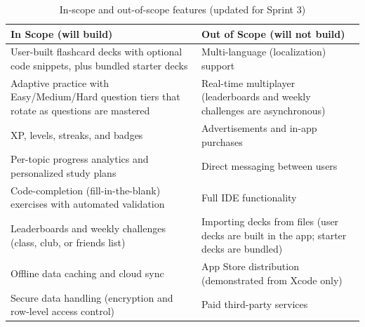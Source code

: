 \documentclass[12pt,letterpaper]{article}
\begin{document}
\begin{table}[H]
\centering
\caption{In-scope and out-of-scope features (updated for Sprint 3)}
\label{tab:scope}
\begin{tabularx}{\textwidth}{@{}Y Y@{}}
\toprule
\textbf{In Scope (will build)} & \textbf{Out of Scope (will not build)} \\
\midrule
User-built flashcard decks with optional code snippets, plus bundled starter decks & Multi-language (localization) support \\
Adaptive practice with Easy/Medium/Hard question tiers that rotate as questions are mastered & Real-time multiplayer (leaderboards and weekly challenges are asynchronous) \\
XP, levels, streaks, and badges & Advertisements and in-app purchases \\
Per-topic progress analytics and personalized study plans & Direct messaging between users \\
Code-completion (fill-in-the-blank) exercises with automated validation & Full IDE functionality \\
Leaderboards and weekly challenges (class, club, or friends list) & Importing decks from files (user decks are built in the app; starter decks are bundled) \\
Offline data caching and cloud sync & App Store distribution (demonstrated from Xcode only) \\
Secure data handling (encryption and row-level access control) & Paid third-party services \\
\bottomrule
\end{tabularx}
\end{table}
\end{document}

